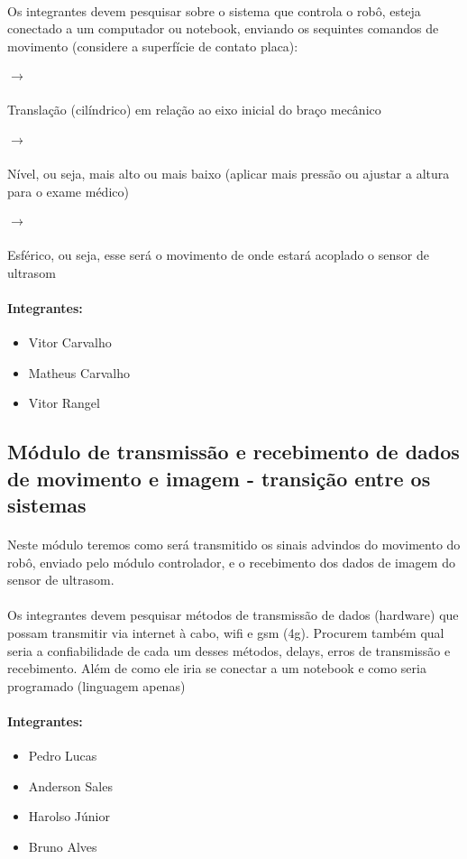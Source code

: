 \documentclass[a4paper]{article}
\begin{document}
\paragraph{} Os integrantes devem pesquisar sobre o sistema que controla o robô, esteja conectado a um computador ou notebook, enviando os  sequintes comandos de movimento (considere a superfície de contato placa):
\subparagraph{$\rightarrow$} Translação (cilíndrico) em relação ao eixo inicial do braço mecânico
\subparagraph{$\rightarrow$} Nível, ou seja, mais alto ou mais baixo (aplicar mais pressão ou ajustar a altura para o exame médico)
\subparagraph{$\rightarrow$} Esférico, ou seja, esse será o movimento de onde estará acoplado o sensor de ultrasom

\paragraph{Integrantes:}
\begin{itemize}
\item Vitor Carvalho
\item Matheus Carvalho
\item Vitor Rangel
\end{itemize}

\subsection{Módulo de transmissão e recebimento de dados de movimento e imagem - transição entre os sistemas}
\paragraph{} Neste módulo teremos como será transmitido os sinais advindos do movimento do robô, enviado pelo módulo controlador, e o recebimento dos dados de imagem do sensor de ultrasom. 

\paragraph{} Os integrantes devem pesquisar métodos de transmissão de dados (hardware) que possam transmitir via internet à cabo, wifi e gsm (4g). Procurem também qual seria a confiabilidade de cada um desses métodos, delays, erros de transmissão e recebimento. Além de como ele iria se conectar a um notebook e como seria programado (linguagem apenas)

\paragraph{Integrantes:}
\begin{itemize}
\item Pedro Lucas
\item Anderson Sales
\item Harolso Júnior
\item Bruno Alves
\end{itemize}
\end{document}

